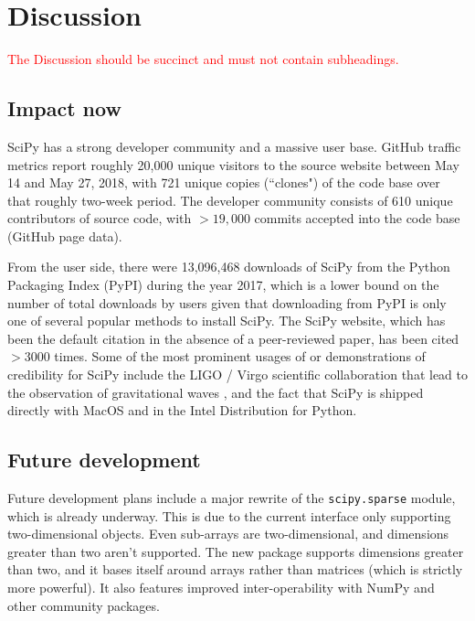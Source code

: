 \documentclass[fleqn,10pt]{wlscirep}
\newcommand{\fixme}[1]{\textcolor{red}{{#1}}}
\begin{document}
\section*{Discussion}

\fixme{The Discussion should be succinct and must not contain subheadings.}

\subsection*{Impact now}


SciPy has a strong developer community and a massive user base. GitHub traffic
metrics report roughly 20,000 unique visitors to the source website between May
14 and May 27, 2018, with 721 unique copies (``clones") of the code base over
that roughly two-week period. The developer community consists of 610 unique
contributors of source code, with $>19,000$ commits accepted into the code base
(GitHub page data).

From the user side, there were 13,096,468 downloads of SciPy from the Python
Packaging Index (PyPI) during the year 2017\cite{pypinfo}, which is a lower
bound on the number of total downloads by users given that downloading from
PyPI is only one of several popular methods to install SciPy.  The SciPy
website\cite{SciPylib}, which has been the default citation in the absence of a
peer-reviewed paper, has been cited $>3000$ times. Some of the most prominent
usages of or demonstrations of credibility for SciPy include the LIGO / Virgo
scientific collaboration that lead to the observation of gravitational waves
\cite{PhysRevLett.116.061102}, and the fact that SciPy is shipped directly with
MacOS and in the Intel Distribution for Python\cite{intel-python}. 

\subsection*{Future development}

Future development plans include a major rewrite of the \texttt{scipy.sparse}
module, which is already underway\cite{abbasi2018sparse}. This is due to the
current interface only supporting two-dimensional objects. Even sub-arrays are
two-dimensional, and dimensions greater than two aren't supported. The new
package supports dimensions greater than two, and it bases itself around arrays
rather than matrices (which is strictly more powerful). It also features
improved inter-operability with NumPy and other community packages.
\end{document}
